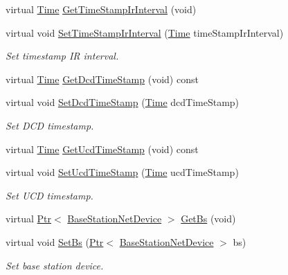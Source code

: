 \begin{DoxyCompactItemize}
\item 
virtual \hyperlink{classns3_1_1Time}{Time} \hyperlink{classns3_1_1UplinkScheduler_aa7516e5a55b513a7640035a9783369c7}{Get\+Time\+Stamp\+Ir\+Interval} (void)
\item 
virtual void \hyperlink{classns3_1_1UplinkScheduler_ad6e89aef6cf4a9d485762f8bd08ec24e}{Set\+Time\+Stamp\+Ir\+Interval} (\hyperlink{classns3_1_1Time}{Time} time\+Stamp\+Ir\+Interval)
\begin{DoxyCompactList}\small\item\em Set timestamp IR interval. \end{DoxyCompactList}\item 
virtual \hyperlink{classns3_1_1Time}{Time} \hyperlink{classns3_1_1UplinkScheduler_a3db19e92a24c71af7d6aff5e94d488fe}{Get\+Dcd\+Time\+Stamp} (void) const 
\item 
virtual void \hyperlink{classns3_1_1UplinkScheduler_a18ccfd91b3f58a55f7249bbafb858f5c}{Set\+Dcd\+Time\+Stamp} (\hyperlink{classns3_1_1Time}{Time} dcd\+Time\+Stamp)
\begin{DoxyCompactList}\small\item\em Set D\+CD timestamp. \end{DoxyCompactList}\item 
virtual \hyperlink{classns3_1_1Time}{Time} \hyperlink{classns3_1_1UplinkScheduler_a709e1a0e3c5ab174b0e1bc123dcfd676}{Get\+Ucd\+Time\+Stamp} (void) const 
\item 
virtual void \hyperlink{classns3_1_1UplinkScheduler_a0dff82b69865688622c0453a35bffe98}{Set\+Ucd\+Time\+Stamp} (\hyperlink{classns3_1_1Time}{Time} ucd\+Time\+Stamp)
\begin{DoxyCompactList}\small\item\em Set U\+CD timestamp. \end{DoxyCompactList}\item 
virtual \hyperlink{classns3_1_1Ptr}{Ptr}$<$ \hyperlink{classns3_1_1BaseStationNetDevice}{Base\+Station\+Net\+Device} $>$ \hyperlink{classns3_1_1UplinkScheduler_afe61b7de71d92d2dff1b135744a6ff7e}{Get\+Bs} (void)
\item 
virtual void \hyperlink{classns3_1_1UplinkScheduler_a28a8d5aa6e61d4ea91388ac3c76e759f}{Set\+Bs} (\hyperlink{classns3_1_1Ptr}{Ptr}$<$ \hyperlink{classns3_1_1BaseStationNetDevice}{Base\+Station\+Net\+Device} $>$ bs)
\begin{DoxyCompactList}\small\item\em Set base station device. \end{DoxyCompactList}\item 

\end{DoxyCompactItemize}
